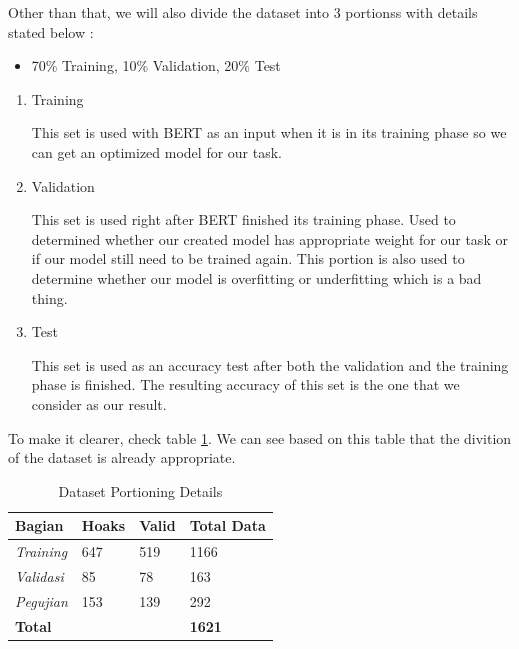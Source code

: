 Other than that, we will also divide the dataset into 3 portionss with details stated below :

\begin{itemize}
    \item 70\% Training, 10\% Validation, 20\% Test
\end{itemize}

\begin{enumerate}
    \item Training

          This set is used with BERT as an input when it is in its training phase so we can get an optimized model for our task.

    \item Validation

          This set is used right after BERT finished its training phase. Used to determined whether our created model has appropriate weight for our task or if our model still need to be trained again. This portion is also used to determine whether our model is overfitting or underfitting which is a bad thing.

    \item Test

          This set is used as an accuracy test after both the validation and the training phase is finished. The resulting accuracy of this set is the one that we consider as our result.

\end{enumerate}

To make it clearer, check table \ref{tab:dataset_section}. We can see based on this table that the divition of the dataset is already appropriate.

\begin{table}[h]
    \caption{Dataset Portioning Details}
    \label{tab:dataset_section}
    \centering
    \begin{tabular}{ | l | l | l | l | }
        \hline
        \textbf{Bagian}                      & \textbf{Hoaks} & \textbf{Valid} & \textbf{Total Data} \\ \hline
        \textit{Training}                    & 647            & 519            & 1166                \\ \hline
        \textit{Validasi}                    & 85             & 78             & 163                 \\ \hline
        \textit{Pegujian}                    & 153            & 139            & 292                 \\ \hline
        \multicolumn{3}{|l|}{\textbf{Total}} & \textbf{1621}                                         \\ \hline
    \end{tabular}
\end{table}

